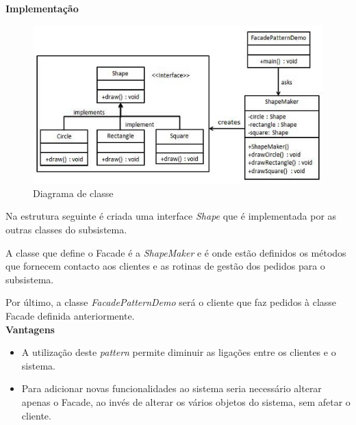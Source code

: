 \textbf{Implementação}

\begin{figure}[!h]
\centering
\includegraphics[scale=0.7]{img/facade_diagrama}
\caption{Diagrama de classe}
\end{figure}

Na estrutura seguinte é criada uma interface \textit{Shape} que é implementada por as outras classes do subsistema.

A classe que define o Facade é a \textit{ShapeMaker} e é onde estão definidos os métodos que fornecem contacto aos clientes e as rotinas de gestão dos pedidos para o subsistema.

Por último, a classe \textit{FacadePatternDemo} será o cliente que faz pedidos à classe Facade definida anteriormente.\\

\textbf{Vantagens}

\begin{itemize}
\item A utilização deste \textit{pattern} permite diminuir as ligações entre os clientes e o sistema.
\item Para adicionar novas funcionalidades ao sistema seria necessário alterar apenas o Facade, ao invés de alterar os vários objetos do sistema, sem afetar o cliente.\\
\end{itemize}




